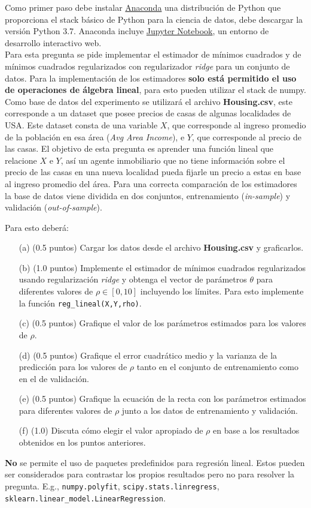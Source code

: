 \documentclass[11pt,letterpaper]{article}
\begin{document}
Como primer paso debe instalar \href{https://www.anaconda.com/distribution/}{Anaconda} una distribución de Python que proporciona el stack básico de Python para la ciencia de datos, debe descargar la versión Python 3.7. Anaconda incluye  \href{https://jupyter.org/}{Jupyter Notebook}, un entorno de desarrollo interactivo web.\\

Para esta pregunta se pide implementar el estimador de mínimos cuadrados y de mínimos cuadrados regularizados con regularizador \textit{ridge} para un conjunto de datos. Para la implementación de los estimadores \textbf{solo está permitido el uso de operaciones de álgebra lineal}, para esto pueden utilizar el stack de numpy.\\

Como base de datos del experimento se utilizará el archivo \textbf{Housing.csv}, este corresponde a un dataset que posee precios de casas de algunas localidades de USA. Este dataset consta de  una variable $X$, que corresponde al ingreso promedio de la población en esa área (\textit{Avg Area Income}), e $Y$, que corresponde al precio de las casas. El objetivo de esta pregunta es aprender una función lineal que relacione $X$ e $Y$, así un agente inmobiliario que no tiene información sobre el precio de las casas en una nueva localidad pueda fijarle un precio a estas en base al ingreso promedio del área. Para una correcta comparación de los estimadores la base de datos viene dividida en dos conjuntos, entrenamiento (\textit{in-sample}) y validación (\textit{out-of-sample}).

Para esto deberá:
\begin{itemize}
	\item[(a)] (0.5 puntos) Cargar los datos desde el archivo \textbf{Housing.csv} y graficarlos.
	\item[(b)] (1.0 puntos) Implemente el estimador de mínimos cuadrados regularizados usando regularización \textit{ridge} y obtenga el vector de parámetros $\theta$ para diferentes valores de $\rho \in [0, 10]$ incluyendo los límites. Para esto implemente la función \texttt{reg\_lineal(X,Y,rho)}. 
	\item[(c)] (0.5 puntos) Grafique el valor de los parámetros estimados para los valores de $\rho$.
	\item[(d)] (0.5 puntos) Grafique el error cuadrático medio y la varianza de la predicción para los valores de $\rho$ tanto en el conjunto de entrenamiento como en el de validación. 
	\item[(e)] (0.5 puntos) Grafique la ecuación de la recta con los parámetros estimados para diferentes valores de $\rho$ junto a los datos de entrenamiento y validación.
	\item[(f)] (1.0) Discuta cómo elegir  el valor apropiado de $\rho$ en base a los resultados obtenidos en los puntos anteriores.
\end{itemize}

 \textbf{No} se permite el uso de paquetes predefinidos para regresión lineal. Estos pueden ser considerados para contrastar los propios resultados pero no para resolver la pregunta. E.g., \texttt{numpy.polyfit},  \texttt{scipy.stats.linregress}, \texttt{sklearn.linear\_model.LinearRegression}.
\end{document}
